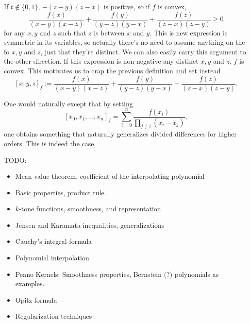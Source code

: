 If $t \notin \{0, 1\}$, $-(z - y)(z - x)$ is positive, so if $f$ is convex,
\[
	\frac{f(x)}{(x - y)(x - z)} + \frac{f(y)}{(y - z)(y - x)} + \frac{f(z)}{(z - x)(z - y)} \geq 0
\]
for any $x, y$ and $z$ such that $z$ is between $x$ and $y$. This is new expression is symmetric in its variables, so actually there's no need to assume anything on the fo $x, y$ and $z$, just that they're distinct. We can also easily carry this argument to the other direction. If this expression is non-negative any distinct $x, y$ and $z$, $f$ is convex. This motivates us to crap the previous definition and set instead
\[
	[x, y, z]_{f} := \frac{f(x)}{(x - y)(x - z)} + \frac{f(y)}{(y - z)(y - x)} + \frac{f(z)}{(z - x)(z - y)}.
\]

One would naturally except that by setting
\[ 
	[x_{0}, x_{1}, \ldots, x_{n}]_{f} = \sum_{i = 0}^{n} \frac{f(x_{i})}{\prod_{j \neq i} (x_{i} - x_{j})},
\]
one obtains something that naturally generalizes divided differences for higher orders. This is indeed the case.

TODO:
\begin{itemize}
	\item Mean value theorem, coefficient of the interpolating polynomial
	\item Basic properties, product rule.
	\item $k$-tone functions, smoothness, and representation
	\item Jensen and Karamata inequalities, generalizations
	\item Cauchy's integral formula
	\item Polynomial interpolation
	\item Peano Kernels: Smoothness properties, Bernstein (?) polynomials as examples.
	\item Opitz formula
	\item Regularization techniques
\end{itemize}
